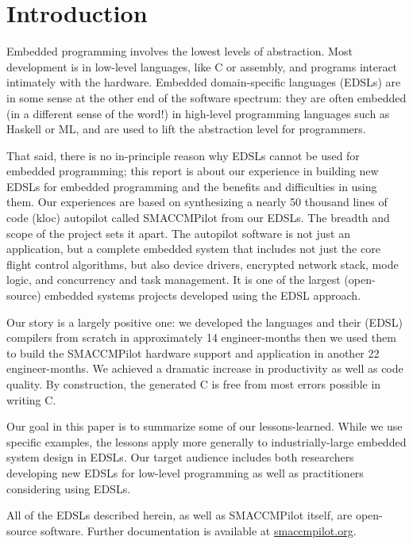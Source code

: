 \section{Introduction}

Embedded programming involves the lowest levels of abstraction.  Most development
is in low-level languages, like C or assembly, and programs interact intimately
with the hardware.  Embedded domain-specific languages (EDSLs) are in
some sense at the other end of the software spectrum: they are often embedded
(in a different sense of the word!) in high-level programming languages such as
Haskell or ML, and are used to lift the abstraction level for programmers.

That said, there is no in-principle reason why EDSLs cannot be used for embedded
programming; this report is about our experience in building new EDSLs for
embedded programming and the benefits and difficulties in using them.  Our
experiences are based on synthesizing a nearly 50 thousand lines of code (kloc)
autopilot called SMACCMPilot from our EDSLs.  The breadth and scope of the
project sets it apart.  The autopilot software is not just an application, but a
complete embedded system that includes not just the core flight control
algorithms, but also device drivers, encrypted network stack, mode logic, and
concurrency and task management.  It is one of the largest (open-source)
embedded systems projects developed using the EDSL approach.

Our story is a largely positive one: we developed the languages and their (EDSL)
compilers from scratch in approximately 14 engineer-months then we used them to
build the SMACCMPilot hardware support and application in another 22
engineer-months.  We achieved a dramatic increase in productivity as well as
code quality.  By construction, the generated C is free from most errors
possible in writing C.

Our goal in this paper is to summarize some of our lessons-learned.  While we
use specific examples, the lessons apply more generally to industrially-large
embedded system design in EDSLs.  Our target audience includes both researchers
developing new EDSLs for low-level programming as well as practitioners
considering using EDSLs.

All of the EDSLs described herein, as well as SMACCMPilot itself, are
open-source software. Further documentation is available at \url{smaccmpilot.org}.



